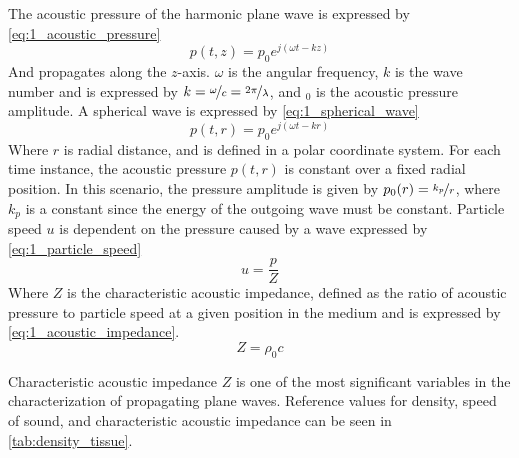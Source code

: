 The acoustic pressure of the harmonic plane wave is expressed by \cref{eq:1_acoustic_pressure}
\begin{equation} \label{eq:1_acoustic_pressure}
	p(t,z)=p_{0} e^{j(\omega t - k z)}
\end{equation}
And propagates along the $z$-axis. $\omega$ is the angular frequency, $k$ is the wave number and is expressed by $k=\nicefrac{\omega}{c}=\nicefrac{2\pi}{\lambda}$, and $_{0}$ is the acoustic pressure amplitude. A spherical wave is expressed by \cref{eq:1_spherical_wave}
\begin{equation} \label{eq:1_spherical_wave}
	p(t,r)=p_{0} e^{j(\omega t - k r)}
\end{equation}
Where $r$ is radial distance, and is defined in a polar coordinate system. For each time instance, the acoustic pressure $p(t,r)$ is constant over a fixed radial position. In this scenario, the pressure amplitude is given by $p_{0}(r) = \nicefrac{k_{p}}{r}$, where $k_{p}$ is a constant since the energy of the outgoing wave must be constant.  Particle speed $u$ is dependent on the pressure caused by a wave expressed by \cref{eq:1_particle_speed}
\begin{equation} \label{eq:1_particle_speed}
	u = \frac{p}{Z}
\end{equation}
Where $Z$ is the characteristic acoustic impedance, defined as the ratio of acoustic pressure to particle speed at a given position in the medium and is expressed by \cref{eq:1_acoustic_impedance}.
\begin{equation} \label{eq:1_acoustic_impedance}
	Z = \rho_{0} c
\end{equation}

Characteristic acoustic impedance $Z$ is one of the most significant variables in the characterization of propagating plane waves. Reference values for density, speed of sound, and characteristic acoustic impedance can be seen in \cref{tab:density_tissue}.


